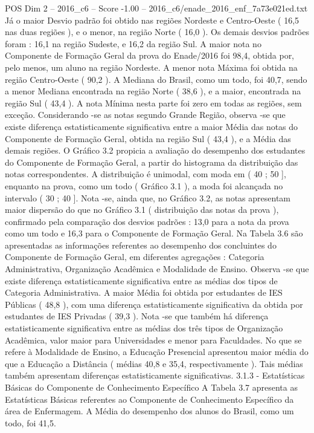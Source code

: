 \begin{textsample}{POS Dim 2 – 2016\_c6 – Score -1.00 – 2016\_c6/enade\_2016\_enf\_7a73e021ed.txt}
Já o maior Desvio padrão foi obtido nas regiões Nordeste e Centro-Oeste ( 16,5 nas duas regiões ), e o menor, na região Norte ( 16,0 ).
Os demais desvios padrões foram : 16,1 na região Sudeste, e 16,2 da região Sul.
A maior nota no Componente de Formação Geral da prova do Enade/2016 foi 98,4, obtida por, pelo menos, um aluno na região Nordeste.
A menor nota Máxima foi obtida na região Centro-Oeste ( 90,2 ).
A Mediana do Brasil, como um todo, foi 40,7, sendo a menor Mediana encontrada na região Norte ( 38,6 ), e a maior, encontrada na região Sul ( 43,4 ).
A nota Mínima nesta parte foi zero em todas as regiões, sem exceção.
Considerando -se as notas segundo Grande Região, observa -se que existe diferença estatisticamente significativa entre a maior Média das notas do Componente de Formação Geral, obtida na região Sul ( 43,4 ), e a Média das demais regiões.
O Gráfico 3.2 propicia a avaliação do desempenho dos estudantes do Componente de Formação Geral, a partir do histograma da distribuição das notas correspondentes.
A distribuição é unimodal, com moda em ( 40 ; 50 ], enquanto na prova, como um todo ( Gráfico 3.1 ), a moda foi alcançada no intervalo ( 30 ; 40 ].
Nota -se, ainda que, no Gráfico 3.2, as notas apresentam maior dispersão do que no Gráfico 3.1 ( distribuição das notas da prova ), confirmado pela comparação dos desvios padrões : 13,0 para a nota da prova como um todo e 16,3 para o Componente de Formação Geral.
Na Tabela 3.6 são apresentadas as informações referentes ao desempenho dos concluintes do Componente de Formação Geral, em diferentes agregações : Categoria Administrativa, Organização Acadêmica e Modalidade de Ensino.
Observa -se que existe diferença estatisticamente significativa entre as médias dos tipos de Categoria Administrativa.
A maior Média foi obtida por estudantes de IES Públicas ( 48,8 ), com uma diferença estatisticamente significativa da obtida por estudantes de IES Privadas ( 39,3 ).
Nota -se que também há diferença estatisticamente significativa entre as médias dos três tipos de Organização Acadêmica, valor maior para Universidades e menor para Faculdades.
No que se refere à Modalidade de Ensino, a Educação Presencial apresentou maior média do que a Educação a Distância ( médias 40,8 e 35,4, respectivamente ).
Tais médias também apresentam diferenças estatisticamente significativas. 3.1.3 - Estatísticas Básicas do Componente de Conhecimento Específico A Tabela 3.7 apresenta as Estatísticas Básicas referentes ao Componente de Conhecimento Específico da área de Enfermagem.
A Média do desempenho dos alunos do Brasil, como um todo, foi 41,5.

\end{textsample}
